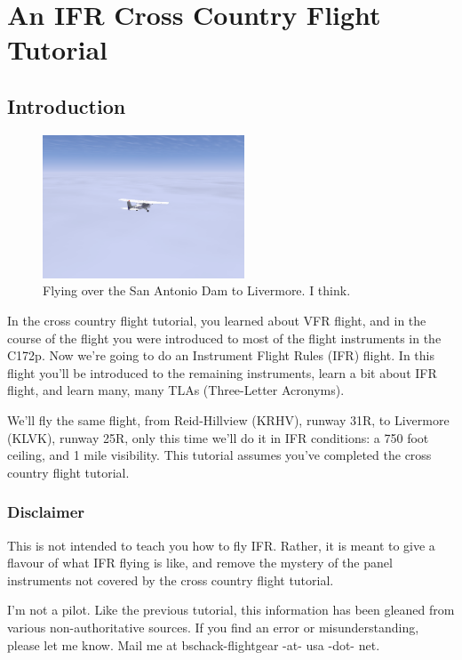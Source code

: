 \chapter{An IFR Cross Country Flight Tutorial}

\section{Introduction}

\begin{figure}[h]
  \begin{center}
    \includegraphics[width=6cm]{img/somewhere}
    \caption{Flying over the San Antonio Dam to Livermore.  I think.}
    \label{fig:somewhere}
  \end{center}
\end{figure}

In the cross country flight tutorial, you learned about VFR flight,
and in the course of the flight you were introduced to most of the
flight instruments in the C172p.  Now we're going to do an Instrument
Flight Rules (IFR) flight.  In this flight you'll be introduced to the
remaining instruments, learn a bit about IFR flight, and learn many,
many TLAs (Three-Letter Acronyms).

We'll fly the same flight, from Reid-Hillview (KRHV), runway 31R, to
Livermore (KLVK), runway 25R, only this time we'll do it in IFR
conditions: a 750 foot ceiling, and 1 mile visibility.  This tutorial
assumes you've completed the cross country flight tutorial.

\subsection{Disclaimer}

This is not intended to teach you how to fly IFR.  Rather, it is meant
to give a flavour of what IFR flying is like, and remove the mystery
of the panel instruments not covered by the cross country flight
tutorial.

I'm not a pilot.  Like the previous tutorial, this information has
been gleaned from various non-authoritative sources.  If you find an
error or misunderstanding, please let me know.  Mail me at
bschack-flightgear -at- usa -dot- net.

